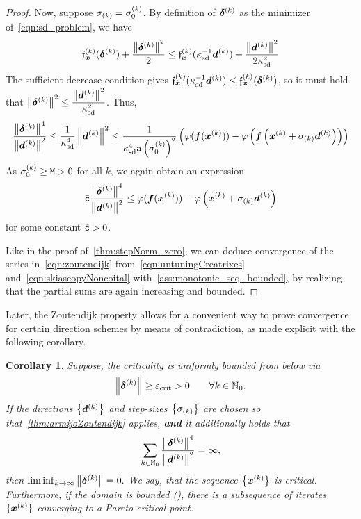 \documentclass{article}
\theoremstyle{plain}
\newtheorem{corollary}[theorem]{Corollary}
\theoremstyle{definition}
\begin{document}
\begin{proof}
	Now, suppose $\sigma_{(k)} = \sigma^{(k)}_{0}$.
	By definition of $\bm{\delta}^{(k)}$ as the minimizer of~\eqref{eqn:sd_problem}, we have
	$$
	\mathfrak{f}_{\bm{x}}^{(k)}(\bm{\delta}^{(k)}) + \frac{\left\|\bm{\delta}^{(k)}\right\|^2}{2}
	\leq
	\mathfrak{f}_{\bm{x}}^{(k)}(\kappa_{\mathrm{sd}}^{-1}\bm{d}^{(k)}) + \frac{\left\|\bm{d}^{(k)}\right\|^2}{2\kappa_{\mathrm{sd}}^2}
	$$
	The sufficient decrease condition gives $\mathfrak{f}_{\bm{x}}^{(k)}(\kappa_{\mathrm{sd}}^{-1}\bm{d}^{(k)}) \leq \mathfrak{f}_{\bm{x}}^{(k)}(\bm{\delta}^{(k)})$,
	so it must hold that $\left\|\bm{\delta}^{(k)}\right\|^2 \leq \dfrac{\left\|\bm{d}^{(k)}\right\|^2}{\kappa_{\mathrm{sd}}^2}$.
	Thus,
	$$
	\frac{
		\left\|\bm{\delta}^{(k)}\right\|^4
	}{
		\left\|\bm{d}^{(k)}\right\|^2
	}
	\leq
	\frac{1}{\kappa_{\mathrm{sd}}^4}
	\left\|\bm{d}^{(k)}\right\|^2
	\leq
	\frac{1}{\kappa_{\mathrm{sd}}^4\mathtt{a}\left(\sigma^{(k)}_{0}\right)^2}
	\left(
	\varphi(\bm{f}(\bm{x}^{(k)}))
	-
	\varphi\left(\bm{f}\left(\bm{x}^{(k)}+\sigma_{(k)} \bm{d}^{(k)}\right)\right)
	\right)
	$$
	As $\sigma^{(k)}_{0} \ge \mathtt{M} > 0$ for all $k$,
	we again obtain an expression
	\begin{equation}
	\bar{\mathtt c}
	\frac{
		\left\|\bm{\delta}^{(k)}\right\|^4
	}{
		\left\|\bm{d}^{(k)}\right\|^2
	}
	\leq
	\varphi(\bm{f}(\bm{x}^{(k)}))
	-
	\varphi\left(\bm{x}^{(k)}+\sigma_{(k)} \bm{d}^{(k)}\right)
	\label{eqn:skiascopyNoncoital}
    \end{equation}
	for some constant $\bar{\mathtt c}>0$.

	Like in the proof of~\cref{thm:stepNorm_zero},
	we can 
	deduce convergence of the series in~\eqref{eqn:zoutendijk}
	from~\eqref{eqn:untuningCreatrixes}
	and~\eqref{eqn:skiascopyNoncoital} with~\cref{ass:monotonic_seq_bounded},
	by realizing that the partial sums are again increasing and bounded.
\end{proof}

Later, the Zoutendijk property allows for a convenient 
way to prove convergence for certain direction schemes
by means of contradiction, as 
made explicit with the following corollary.
\begin{corollary}\label{thm:convergence}
	Suppose, the criticality is uniformly bounded from below via
	\begin{equation}
		\left\|\bm{\delta}^{(k)}\right\| \geq \varepsilon_{\mathrm{crit}} > 0 
		\qquad \forall k\in\mathbb N_0.
		\label{eqn:critBoundedBelow}
	\end{equation}
	If the directions $\left\{\bm{d}^{(k)}\right\}$ and 
	step-sizes $\left\{\sigma_{(k)}\right\}$ are chosen so 
	that~\cref{thm:armijoZoutendijk}
	applies, \textbf{and} it additionally holds that
	$$
		\sum_{k\in\mathbb N_0}
		\frac{\left\|\bm{\delta}^{(k)}\right\|^4}{\left\|\bm{d}^{(k)}\right\|^2}
		= 
		\infty
		,
	$$
	then
	$
	\liminf_{k \to \infty}
	\left\|\bm{\delta}^{(k)}\right\| = 0.
	$
	We say, that the sequence $\left\{\bm{x}^{(k)}\right\}$ is critical.
	Furthermore, if the domain is bounded (),
	there is a subsequence of iterates $\{\bm{x}^{(k)}\}$
	converging to a Pareto-critical point.
\end{corollary}
\end{document}
